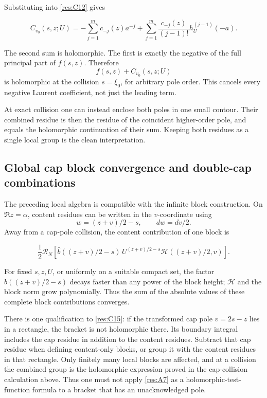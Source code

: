 \documentclass[11pt]{article}
\numberwithin{equation}{section}
\newcommand{\HH}{\mathcal H}
\begin{document}
Substituting into \eqref{res:C12} gives

\begin{equation}\label{res:C14}
C_{v_0}(s,z;U)
 =-\sum_{j=1}^{m}c_{-j}(z)a^{-j}
 +\sum_{j=1}^{m}\frac{c_{-j}(z)}{(j-1)!}
 h_U^{(j-1)}(-a).
\end{equation}

The second sum is holomorphic. The first is exactly the negative of the
full principal part of \(f(s,z)\). Therefore \[
 f(s,z)+C_{v_0}(s,z;U)
\] is holomorphic at the collision \(s=\xi_0\), for arbitrary pole
order. This cancels every negative Laurent coefficient, not just the
leading term.

At exact collision one can instead enclose both poles in one small
contour. Their combined residue is then the residue of the coincident
higher-order pole, and equals the holomorphic continuation of their sum.
Keeping both residues as a single local group is the clean
interpretation.

\subsection{Global cap block convergence and double-cap
combinations}\label{global-cap-block-convergence-and-double-cap-combinations}

The preceding local algebra is compatible with the infinite block
construction. On \(\Re z=\alpha\), content residues can be written in
the \(v\)-coordinate using \[
 w=(z+v)/2-s,\qquad dw=dv/2.
\] Away from a cap-pole collision, the content contribution of one block
is

\begin{equation}\label{res:C15}
\frac12\mathcal R_N\left[
 \widehat b((z+v)/2-s)\,
 U^{(z+v)/2-s}\HH((z+v)/2,v)\right].
\end{equation}

For fixed \(s,z,U\), or uniformly on a suitable compact set, the factor
\(\widehat b((z+v)/2-s)\) decays faster than any power of the block
height; \(\HH\) and the block norm grow polynomially. Thus the sum of
the absolute values of these complete block contributions converges.

There is one qualification to \eqref{res:C15}: if the transformed cap
pole \(v=2s-z\) lies in a rectangle, the bracket is not holomorphic
there. Its boundary integral includes the cap residue in addition to the
content residues. Subtract that cap residue when defining content-only
blocks, or group it with the content residues in that rectangle. Only
finitely many local blocks are affected, and at a collision the combined
group is the holomorphic expression proved in the cap-collision
calculation above. Thus one must not apply \eqref{res:A7} as a
holomorphic-test-function formula to a bracket that has an
unacknowledged pole.
\end{document}
